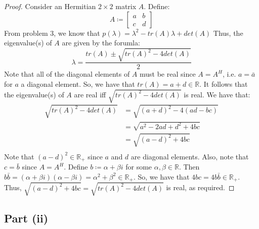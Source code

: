 \documentclass{article}
\begin{document}
\begin{proof}
Consider an Hermitian $2 \times 2$ matrix $A$. Define:
$$A \coloneqq \begin{bmatrix} a & b \\ c & d \end{bmatrix}$$
From problem 3, we know that $p(\lambda) = \lambda^2 - tr(A)\lambda + det(A)$ Thus, the eigenvalue(s) of $A$ are given by the forumla:
$$\lambda = \frac{tr(A) \pm \sqrt{tr(A)^2 - 4det(A)}}{2}$$
Note that all of the diagonal elements of $A$ must be real since $A = A^{H}$, i.e. $a = \bar a$ for $a$ a diagonal element. So, we have that $tr(A) = a + d \in \mathbb{R}$. It follows that the eigenvalue(s) of $A$ are real iff $\sqrt{tr(A)^2 - 4det(A)}$ is real. We have that:
\begin{align*}
\sqrt{tr(A)^2 - 4det(A)} &= \sqrt{(a + d)^2 - 4(ad - bc)} \\
&=  \sqrt{a^2 - 2ad + d^2 + 4bc} \\
&=  \sqrt{(a - d)^2 + 4bc} \\
\end{align*}
Note that $(a - d)^2 \in \mathbb{R}_+$ since $a$ and $d$ are diagonal elements. Also, note that $c = \bar b$ since $A = A^{H}$. Define $b \coloneqq \alpha + \beta i$ for some $\alpha, \beta \in \mathbb{R}$. Then $b\bar b = (\alpha + \beta i)(\alpha - \beta i) = \alpha^2 + \beta^2 \in \mathbb{R}_+$. So, we have that $4bc = 4b\bar b \in  \mathbb{R}_+$. Thus, $\sqrt{(a - d)^2 + 4bc} = \sqrt{tr(A)^2 - 4det(A)}$ is real, as required.
\end{proof}

\subsection*{Part (ii)}
\end{document}
